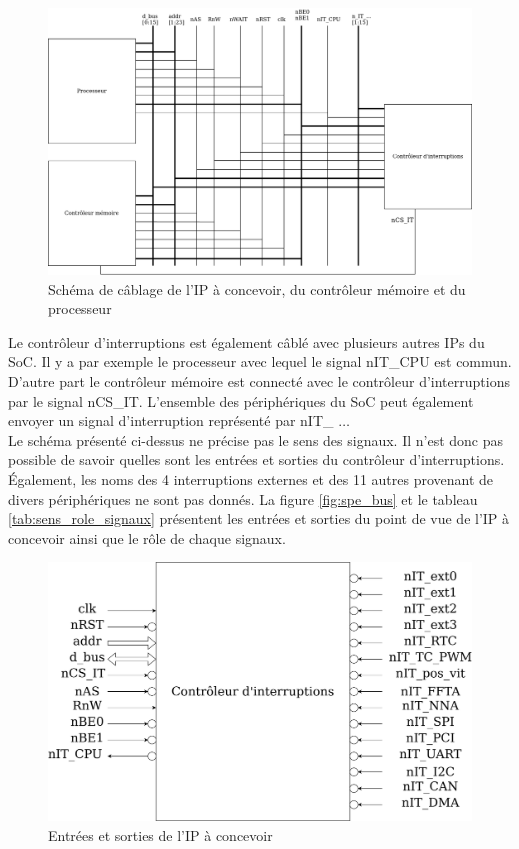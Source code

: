 \begin{figure}[H]
	\centering
	\includegraphics[width=1\linewidth]{figure/schema_cablage.png}
	\caption{Schéma de câblage de l'IP à concevoir, du contrôleur mémoire et du processeur}
	\label{fig:schema_cablage}
\end{figure}
	
Le contrôleur d'interruptions est également câblé avec plusieurs autres IPs du SoC.
Il y a par exemple le processeur avec lequel le signal nIT\_CPU est commun.
D'autre part le contrôleur mémoire est connecté avec le contrôleur d'interruptions par le signal nCS\_IT. L'ensemble des périphériques du SoC peut également envoyer un signal d'interruption représenté par nIT\_ $\dots$\\
	
Le schéma présenté ci-dessus ne précise pas le sens des signaux.
Il n'est donc pas possible de savoir quelles sont les entrées et sorties du contrôleur d'interruptions.
Également, les noms des 4 interruptions externes et des 11 autres provenant de divers périphériques ne sont pas donnés.
La figure \ref{fig:spe_bus} et le tableau \ref{tab:sens_role_signaux} présentent les entrées et sorties du point de vue de l'IP à concevoir ainsi que le rôle de chaque signaux. 
	
\begin{figure}[H]
	\centering
	\includegraphics[width=0.8\linewidth]{figure/delimitation_systeme.png}
	\caption{Entrées et sorties de l'IP à concevoir}
	\label{fig:inout_ip}
\end{figure}


